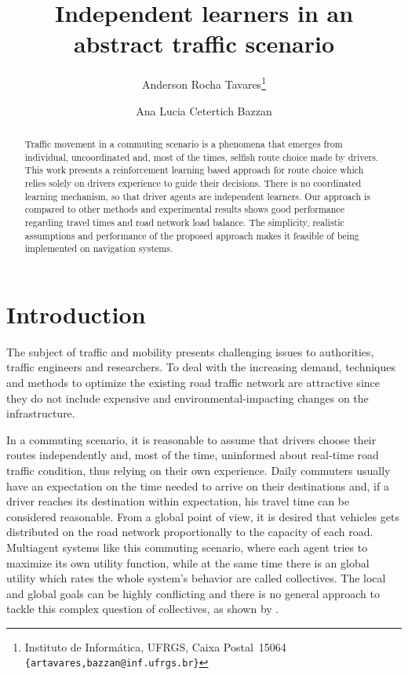 \documentclass{RITA}
\author{
  Anderson Rocha Tavares\footnote{Instituto de Inform\'atica, UFRGS, Caixa Postal~15064\\
  \texttt{\{artavares,bazzan@inf.ufrgs.br\}}}
  \and Ana Lucia Cetertich Bazzan\footnotemark[1]
}
\title{Independent learners in an abstract traffic scenario}
\begin{document}
\maketitle

\begin{abstract}
Traffic movement in a commuting scenario is a phenomena that emerges from individual, uncoordinated and, most of the times, selfish route choice made by drivers. This work presents a reinforcement learning based approach for route choice which relies solely on drivers experience to guide their decisions. There is no coordinated learning mechanism, so that driver agents are independent learners. Our approach is compared to other methods and experimental results shows good performance regarding travel times and road network load balance. The simplicity, realistic assumptions and performance of the proposed approach makes it feasible of being implemented on navigation systems.
\end{abstract}





\section{Introduction}
\label{sec:intro}

The subject of traffic and mobility presents challenging issues to authorities, traffic engineers and researchers. To deal with the increasing demand, techniques and methods to optimize the existing road traffic network are attractive since they do not include expensive and environmental-impacting changes on the infrastructure.

In a commuting scenario, it is reasonable to assume that drivers choose their routes independently and, most of the time, uninformed about real-time road traffic condition, thus relying on their own experience. Daily commuters usually have an expectation on the time needed to arrive on their destinations and, if a driver reaches its destination within expectation, his travel time can be considered  reasonable. From a global point of view, it is desired that vehicles gets distributed on the road network proportionally to the capacity of each road. Multiagent systems like this commuting scenario, where each agent tries to maximize its own utility function, while at the same time there is an global utility which rates the whole system's behavior are called collectives. The local and global goals can be highly conflicting and there is no general approach to tackle this complex question of collectives, as shown by \cite{Tumer&Wolpert2004}.
\end{document}
